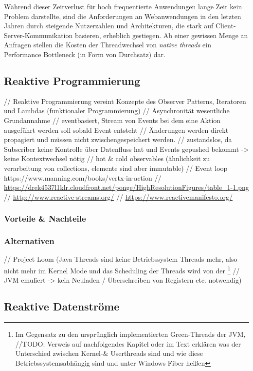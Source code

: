 Während dieser Zeitverlust für hoch frequentierte Anwendungen lange Zeit kein Problem darstellte,
sind die Anforderungen an Webanwendungen in den letzten Jahren durch steigende Nutzerzahlen und Architekturen,
die stark auf Client-Server-Kommunikation basieren, erheblich gestiegen.
Ab einer gewissen Menge an Anfragen stellen die Kosten der Threadwechsel von \textit{native threads} ein Performance Bottleneck
(in Form von Durchsatz) dar.

\subsection{Reaktive Programmierung}
\label{section:reaktive_programmierung}

// Reaktive Programmierung vereint Konzepte des Observer Patterns, Iteratoren und Lambdas (funktionaler Programmierung)
// Asynchronität wesentliche Grundannahme
// eventbasiert, Stream von Events bei dem eine Aktion ausgeführt werden soll sobald Event entsteht
// Änderungen werden direkt propagiert und müssen nicht zwischengespeichert werden.
// zustandslos, da Subscriber keine Kontrolle über Datenfluss hat und Events gepushed bekommt -> keine Kontextwechsel nötig
// hot \& cold observables (ähnlichkeit zu verarbeitung von collections, elemente sind aber immutable)
// Event loop https://www.manning.com/books/vertx-in-action
// \url{https://drek4537l1klr.cloudfront.net/ponge/HighResolutionFigures/table_1-1.png}
// \url{http://www.reactive-streams.org/}
// \url{https://www.reactivemanifesto.org/}
\subsubsection{Vorteile \& Nachteile}

\subsubsection{Alternativen}
// Project Loom (Java Threads sind keine Betriebssystem Threads mehr, also nicht mehr im Kernel Mode und das Scheduling der Threads wird von der
\footnote{Im Gegensatz zu den ursprünglich implementierten Green-Threads der JVM, //TODO: Verweis auf nachfolgendes Kapitel oder im Text erklären was der Unterschied zwischen Kernel-\& Userthreads sind und wie diese Betriebssystemsabhängig sind und unter Windows Fiber heißen}
// JVM emuliert -> kein Neuladen / Überschreiben von Registern etc. notwendig)
\subsection{Reaktive Datenströme}
\label{section.reaktive_datenströme}

